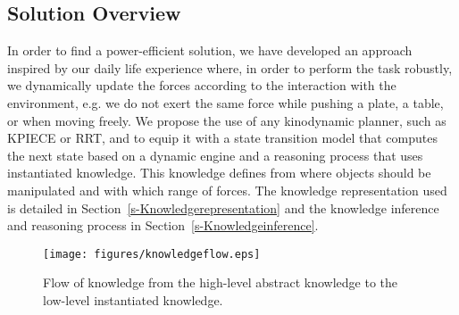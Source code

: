 \documentclass[twocolumn]{svjour3}          %
\begin{document}

\subsection{Solution Overview}
In order to find a power-efficient solution, we have developed an approach inspired by our daily life experience where, in order to perform the task robustly,  we dynamically update the forces according to the interaction with the environment, e.g. we do not exert the same force while pushing a plate, a table, or when moving freely. We propose the use of any kinodynamic planner, such as KPIECE or RRT, and to equip it with a state transition model that computes the next state based on a dynamic engine and a reasoning process that uses instantiated knowledge. This knowledge defines from where objects should be manipulated and with which range of forces.
 The knowledge representation used is detailed in Section~\ref{s-Knowledgerepresentation} and the knowledge inference and reasoning process in Section~\ref{s-Knowledgeinference}.
 
\begin{figure}[t]
\begin{center}
   \texttt{[image: figures/knowledgeflow.eps]}
   \caption{Flow of knowledge from the high-level abstract knowledge to the low-level instantiated knowledge.}\label{fig:knowflow1}
\end{center}
\end{figure}
\end{document}
